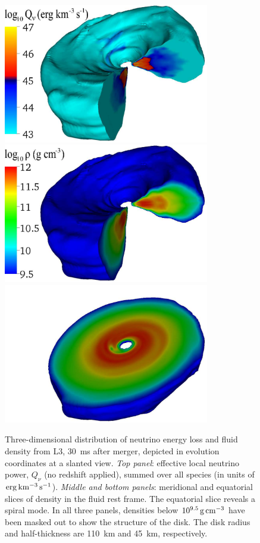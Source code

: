 \begin{figure}
\centering
\includegraphics[width=9cm]{Figures/3D-Q0phys_meridional}
\includegraphics[width=9cm]{Figures/3D-rho0phys_meridional}
\includegraphics[width=9cm]{Figures/3D-rho0phys_equatorial}
\caption[Three-dimensional colorplots of disk density and neutrino energy losses]{
Three-dimensional distribution of neutrino energy loss and fluid density
from L3, 30~ms after merger, depicted in evolution coordinates at a slanted view.
{\em Top panel}: effective local neutrino power, $Q_{\nu}$ (no redshift applied),
summed over all species (in units of $\rm erg\,km^{-3}\,s^{-1}$).
{\em Middle and bottom panels}: meridional and equatorial slices of
density in the fluid rest frame. The equatorial slice reveals a spiral mode.
In all three panels, densities below $10^{9.5}\rm\,g\,cm^{-3}$ have been masked out
to show the structure of the disk. The disk radius and half-thickness
are 110~km and 45~km, respectively.
}
\label{fig:disksnapshot}
\end{figure}

